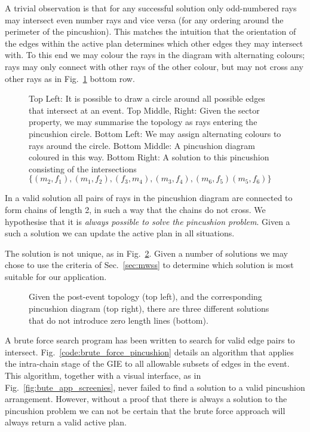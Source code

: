 A trivial observation is that for any successful solution only odd-numbered rays may intersect even number rays and vice versa (for any ordering around the perimeter of the pincushion). This matches the intuition that the orientation of the edges within the active plan determines which other edges they may intersect with. To this end we may colour the rays in the diagram with alternating colours; rays may only connect with other rays of the other colour, but may not cross any other rays as in Fig.~\ref{fig:pincushion} bottom row.

\begin{figure}
  \centering
  \def\svgwidth{1.0\columnwidth}
  
  \caption[The Pincushion diagram]{\label{fig:pincushion}Top Left: It is possible to draw a circle around all possible edges that intersect at an event. Top Middle, Right: Given the sector property, we may summarise the topology as rays entering the pincushion circle. Bottom Left: We may assign alternating colours to rays around the circle. Bottom Middle: A pincushion diagram coloured in this way. Bottom Right: A solution to this pincushion consisting of the intersections $\{(m_2,f_1), (m_1,f_2), (f_3, m_4), (m_3, f_4), (m_6, f_5) (m_5, f_6)\}$}
\end{figure}

In a valid solution all pairs of rays in the pincushion diagram are connected to form chains of length 2, in such a way that the chains do not cross. We hypothesise that it is \emph{always possible to solve the pincushion problem}. Given a such a solution we can update the active plan in all situations.

The solution is not unique, as in Fig.~\ref{fig:mwss_multiple_solns}. Given a number of solutions we may chose to use the criteria of Sec.~\ref{sec:mwss} to determine which solution is most suitable for our application.

\begin{figure}
  \centering
  \def\svgwidth{1.0\columnwidth}
  
  \caption[PWSS events may not have unique solutions]{\label{fig:mwss_multiple_solns}Given the post-event topology (top left), and the corresponding pincushion diagram (top right), there are three different solutions that do not introduce zero length lines (bottom).}
\end{figure}

A brute force search program has been written to search for valid edge pairs to intersect. Fig.~\ref{code:brute_force_pincushion} details an algorithm that applies the intra-chain stage of the GIE to all allowable subsets of edges in the event. This algorithm, together with a visual interface, as in Fig.~\ref{fig:bute_app_screenies}, never failed to find a solution to a valid pincushion arrangement. However, without a proof that there is always a solution to the pincushion problem we can not be certain that the brute force approach will always return a valid active plan.

